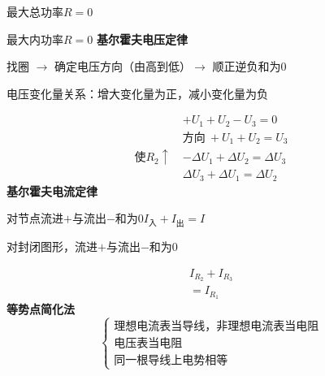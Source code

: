 最大总功率\quad $R=0$

最大内功率\quad $R=0$
\textbf{基尔霍夫电压定律}

找圈 $\to$ 确定电压方向（由高到低）$\to$ 顺正逆负和为0

电压变化量关系：\unclear{$\pm$}增大变化量为正，减小变化量为负

\begin{align*}
&+U_1+U_2-U_3=0\\
&\text{方向}\ +U_1+U_2=U_3\\
\text{使}R_2\uparrow\ &-\Delta U_1+\Delta U_2=\Delta U_3\\
&\Delta U_3+\Delta U_1=\Delta U_2
\end{align*}
\textbf{基尔霍夫电流定律}

对节点流进$+$与流出$-$和为0\qquad $I_{\text{入}}+I_{\text{出}}=I$%

对封闭图形，流进$+$与流出$-$和为0

\[
\begin{aligned}
I_{R_2}+I_{R_3}\\
=I_{R_1}
\end{aligned}
\]
\textbf{等势点简化法}
\[
\left\{\begin{array}{l}
\text{理想电流表当导线，非理想电流表当电阻}\\
\text{电压表当电阻}\\
\text{同一根导线上电势相等}
\end{array}\right.
\]



